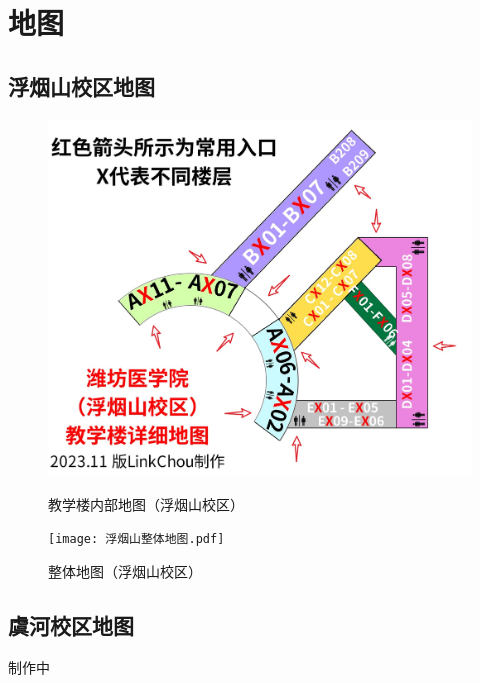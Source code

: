 \chapter[地图]{地图}

\section[浮烟山校区地图]{浮烟山校区地图\footnotemark}
\begin{figure}[H]
    \centering
    \caption[map_teach]{教学楼内部地图（浮烟山校区）}
    \vspace{1em}
    \includegraphics*[width=.9\textwidth]{教学楼_updated.jpg}
    \label{map_t}
\end{figure}

\newpage
\begin{figure}[H]
    \centering
    \caption[map_all]{整体地图（浮烟山校区）}
    \vspace{1em}
    \texttt{[image: 浮烟山整体地图.pdf]}
    \label{map_a}
\end{figure}

\newpage
\section[虞河校区地图]{虞河校区地图}
\begin{center}
    制作中
\end{center}


